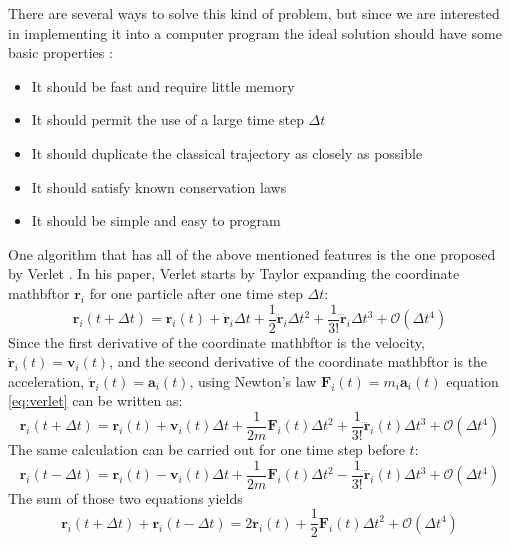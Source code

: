 \documentclass[12pt]{article}
\begin{document}
There are several ways to solve this kind of problem, but since we are interested in implementing it into a computer program the ideal solution
should have some basic properties \cite{Allen1989}:
\begin{itemize}
    \item It should be fast and require little memory
    \item It should permit the use of a large time step $\Delta t$
    \item It should duplicate the classical trajectory as closely as possible
    \item It should satisfy known conservation laws
    \item It should be simple and easy to program
\end{itemize}
One algorithm that has all of the above mentioned features is the one proposed by Verlet \cite{Verlet1967}. In his paper, Verlet starts by Taylor
expanding the coordinate mathbftor $\mathbf{r}_i$ for one particle after one time step $\Delta t$:
\begin{equation}
    \label{eq:verlet}
    \mathbf{r}_i(t+\Delta t) = \mathbf{r}_i(t) + \dot{\mathbf{r}}_i \Delta t + \frac12 \ddot{\mathbf{r}}_i \Delta t^2 + \frac1{3!} \dddot{\mathbf{r}}_i \Delta t^3 +
    \mathcal{O}(\Delta t^4)
\end{equation}
Since the first derivative of the coordinate mathbftor is the velocity, $\dot{\mathbf{r}}_i(t) = \mathbf{v}_i(t)$, and the second derivative of the coordinate 
mathbftor is the acceleration, $\ddot{\mathbf{r}}_i(t) = \mathbf{a}_i(t)$, using Newton's law $\mathbf{F}_i(t) = m_i \mathbf{a}_i(t)$ equation \eqref{eq:verlet} 
can be written as:
\begin{equation}
    \label{eq:verletnew}
    \mathbf{r}_i(t+\Delta t) = \mathbf{r}_i(t) + {\mathbf{v}}_i(t) \Delta t + \frac1{2m} {\mathbf{F}}_i(t) \Delta t^2 + \frac1{3!} \dddot{\mathbf{r}}_i(t)
    \Delta t^3+\mathcal{O}(\Delta t^4)
\end{equation}
The same calculation can be carried out for one time step before $t$:
\begin{equation}
    \label{eq:verletnewminus}
    \mathbf{r}_i(t-\Delta t) = \mathbf{r}_i(t) - {\mathbf{v}}_i(t) \Delta t + \frac1{2m} {\mathbf{F}}_i(t) \Delta t^2 - \frac1{3!} \dddot{\mathbf{r}}_i(t) \Delta t^3+
    \mathcal{O}(\Delta t^4)
\end{equation}
The sum of those two equations yields
\begin{equation}
    \mathbf{r}_i(t+\Delta t) + \mathbf{r}_i(t-\Delta t) = 2\mathbf{r}_i(t) + \frac1{2} {\mathbf{F}}_i(t) \Delta t^2 + \mathcal{O}(\Delta t^4)
\end{equation}
\end{document}
